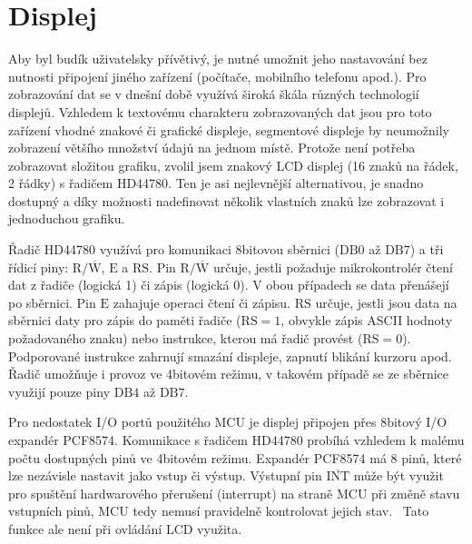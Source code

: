 \section{Displej}
Aby byl budík uživatelsky přívětivý, je nutné umožnit jeho nastavování bez
nutnosti připojení jiného zařízení (počítače, mobilního telefonu apod.).
Pro zobrazování dat se v dnešní době využívá široká škála různých technologií
displejů. Vzhledem k textovému charakteru zobrazovaných dat jsou pro toto
zařízení vhodné znakové či grafické displeje, segmentové displeje by neumožnily
zobrazení většího množství údajů na jednom místě. Protože není potřeba
zobrazovat složitou grafiku, zvolil jsem znakový LCD displej (16 znaků na
řádek, 2 řádky) s řadičem HD44780. Ten je asi nejlevnější alternativou, je
snadno dostupný a díky možnosti nadefinovat několik vlastních znaků lze
zobrazovat i jednoduchou grafiku.

Řadič HD44780 využívá pro komunikaci 8bitovou sběrnici ($\mathrm{DB0}$ až
$\mathrm{DB7}$) a tři řídicí piny: $\mathrm{R}/\overline{\mathrm{W}}$,
$\mathrm{E}$ a $\mathrm{RS}$. Pin $\mathrm{R}/\overline{\mathrm{W}}$ určuje,
jestli požaduje mikrokontrolér čtení dat z řadiče (logická 1) či zápis (logická
0). V obou případech se data přenášejí po sběrnici. Pin $\mathrm{E}$ zahajuje
operaci čtení či zápisu. $\mathrm{RS}$ určuje, jestli jsou data na sběrnici
daty pro zápis do paměti řadiče ($\mathrm{RS} = 1$, obvykle zápis ASCII hodnoty
požadovaného znaku) nebo instrukce, kterou má řadič provést ($\mathrm{RS} =
0$). Podporované instrukce zahrnují smazání displeje, zapnutí blikání kurzoru
apod. Řadič umožňuje i provoz ve 4bitovém režimu, v takovém případě se ze
sběrnice využijí pouze piny $\mathrm{DB4}$ až $\mathrm{DB7}$.~\cite{dshHD44780}

Pro nedostatek I/O portů použitého MCU je displej připojen přes
8bitový \IIC{} I/O expandér PCF8574. Komunikace s řadičem
HD44780 probíhá vzhledem k malému počtu dostupných pinů ve 4bitovém režimu.
Expandér PCF8574 má 8 pinů, které lze nezávisle nastavit jako vstup či výstup.
Výstupní pin $\overline{\mathrm{INT}}$ může být využit pro spuštění
hardwarového přerušení (interrupt) na straně MCU při změně stavu vstupních
pinů, MCU tedy nemusí pravidelně kontrolovat jejich stav.~\cite{dshPCF8574}
Tato funkce ale není při ovládání LCD využita.


